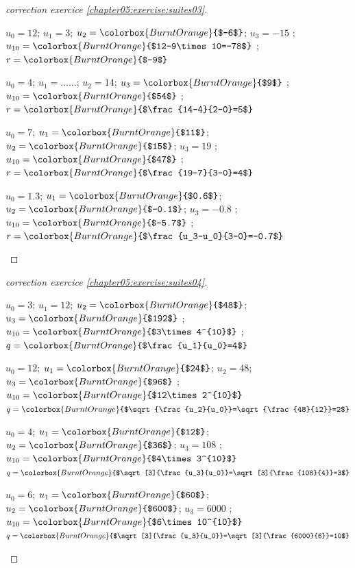 \documentclass[main.tex]{subfiles}
\begin{document}
\begin{proof}[correction exercice \ref{chapter05:exercise:suites03}] \hfill
\vspace{-1em}
\begin{spacing}{2}
	\begin{description} 
		\item  $u_0=12$; $u_1=3$; $u_2=\colorbox{BurntOrange}{$-6$}$; $u_3=-15$ ;\hfill $u_{10}=\colorbox{BurntOrange}{$12-9\times 10=-78$}$  ;  \hfill  {$r=\colorbox{BurntOrange}{$-9$}  $}  
		\item  $u_0=4$; $u_1=\ldots\ldots$; $u_2=14$; $u_3=\colorbox{BurntOrange}{$9$}$ ; \hfill$u_{10}=\colorbox{BurntOrange}{$54$}$  ;  \hfill  {$r=\colorbox{BurntOrange}{$\frac{14-4}{2-0}=5$}  $}  
		\item  $u_0=7$; $u_1=\colorbox{BurntOrange}{$11$}$; $u_2=\colorbox{BurntOrange}{$15$}$; $u_3=19$ ; \hfill$u_{10}=\colorbox{BurntOrange}{$47$}$  ;  \hfill  {$r=\colorbox{BurntOrange}{$\frac{19-7}{3-0}=4$}  $}   
		\item  $u_0=1.3$; $u_1=\colorbox{BurntOrange}{$0.6$}$; $u_2=\colorbox{BurntOrange}{$-0.1$}$; $u_3=-0.8$ ; \hfill$u_{10}=\colorbox{BurntOrange}{$-5.7$}$  ;  \hfill  {$r=\colorbox{BurntOrange}{$\frac{u_3-u_0}{3-0}=-0.7$}$}  
	\end{description} 
\end{spacing}\vspace{-1em}
\end{proof}
%
\begin{proof}[correction exercice \ref{chapter05:exercise:suites04}] \hfill 
\vspace{-1em}
\begin{spacing}{2}
	\begin{description} 
		\item  $u_0=3$; $u_1=12$; $u_2=\colorbox{BurntOrange}{$48$}$; $u_3=\colorbox{BurntOrange}{$192$}$ ;\hfill $u_{10}=\colorbox{BurntOrange}{$3\times 4^{10}$}$  ;  \hfill  {$q=\colorbox{BurntOrange}{$\frac{u_1}{u_0}=4$}  $}  
		\item  $u_0=12$; $u_1=\colorbox{BurntOrange}{$24$}$; $u_2=48$; $u_3=\colorbox{BurntOrange}{$96$}$ ; \hfill$u_{10}=\colorbox{BurntOrange}{$12\times 2^{10}$}$    \hfill  {$q=\colorbox{BurntOrange}{$\sqrt{\frac{u_2}{u_0}}=\sqrt{\frac{48}{12}}=2$}  $}  
		\item  $u_0=4$; $u_1=\colorbox{BurntOrange}{$12$}$; $u_2=\colorbox{BurntOrange}{$36$}$; $u_3=108$ ; \hfill$u_{10}=\colorbox{BurntOrange}{$4\times 3^{10}$}$    \hfill  {$q=\colorbox{BurntOrange}{$\sqrt[3]{\frac{u_3}{u_0}}=\sqrt[3]{\frac{108}{4}}=3$}$}   
		\item  $u_0=6$; $u_1=\colorbox{BurntOrange}{$60$}$; $u_2=\colorbox{BurntOrange}{$600$}$; $u_3=6000$ ; \hfill$u_{10}=\colorbox{BurntOrange}{$6\times 10^{10}$}$     \hfill  {$q=\colorbox{BurntOrange}{$\sqrt[3]{\frac{u_3}{u_0}}=\sqrt[3]{\frac{6000}{6}}=10$}  $}  
	\end{description} 
\end{spacing}\vspace{-1em}
\end{proof}
\end{document}
